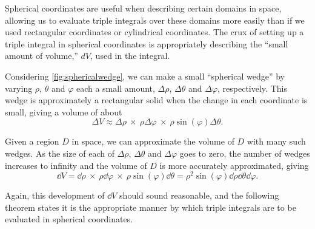 Spherical coordinates are useful when describing certain domains in space, allowing us to evaluate triple integrals over these domains more easily than if we used rectangular coordinates or cylindrical coordinates. The crux of setting up a triple integral in spherical coordinates is appropriately describing the ``small amount of volume,'' $dV$, used in the integral.


Considering \autoref{fig:sphericalwedge}, we can make a small ``spherical wedge'' by varying $\rho$, $\theta$ and $\varphi$ each a small amount, $\Delta\rho$, $\Delta\theta$ and $\Delta\varphi$, respectively. This wedge is approximately a rectangular solid when the change in each coordinate is small, giving a volume of about
\[
\Delta V \approx \Delta\rho\ \times\ \rho\Delta\varphi\ \times\ \rho\sin(\varphi)\Delta\theta.
\]

Given a region $D$ in space, we can approximate the volume of $D$ with many such wedges. As the size of each of $\Delta\rho$, $\Delta\theta$ and $\Delta\varphi$ goes to zero, the number of wedges increases to infinity and the volume of $D$ is more accurately approximated, giving
\[
\dd V = \dd\rho\ \times\ \rho\dd\varphi\ \times\ \rho\sin(\varphi)\dd\theta
=\rho^2\sin(\varphi)\dd\rho\dd\theta\dd\varphi.
\]

Again, this development of $\dd V$ should sound reasonable, and the following theorem states it is the appropriate manner by which triple integrals are to be evaluated in spherical coordinates.


